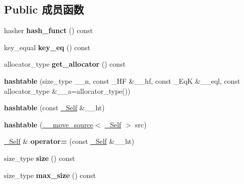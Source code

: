 \subsection*{Public 成员函数}
\begin{DoxyCompactItemize}
\item 
\mbox{\label{classhashtable_ae08e112dcb9455d40455eb795e37feb9}} 
hasher {\bfseries hash\+\_\+funct} () const
\item 
\mbox{\label{classhashtable_a52477a0bb42d4170b09d90291d10ec36}} 
key\+\_\+equal {\bfseries key\+\_\+eq} () const
\item 
\mbox{\label{classhashtable_a45f92c1514cbf95304ddb11228004045}} 
allocator\+\_\+type {\bfseries get\+\_\+allocator} () const
\item 
\mbox{\label{classhashtable_a23fd20375cbba8e496ee88789f89c654}} 
{\bfseries hashtable} (size\+\_\+type \+\_\+\+\_\+n, const \+\_\+\+HF \&\+\_\+\+\_\+hf, const \+\_\+\+EqK \&\+\_\+\+\_\+eql, const allocator\+\_\+type \&\+\_\+\+\_\+a=allocator\+\_\+type())
\item 
\mbox{\label{classhashtable_a68d642038380c9db090140e82daf1fef}} 
{\bfseries hashtable} (const \hyperlink{classhashtable}{\+\_\+\+Self} \&\+\_\+\+\_\+ht)
\item 
\mbox{\label{classhashtable_a1e0899e2bf53826f2531295283fdeb9d}} 
{\bfseries hashtable} (\hyperlink{class____move__source}{\+\_\+\+\_\+move\+\_\+source}$<$ \hyperlink{classhashtable}{\+\_\+\+Self} $>$ src)
\item 
\mbox{\label{classhashtable_a5bc53028dd2381c784e4bb92a318f35e}} 
\hyperlink{classhashtable}{\+\_\+\+Self} \& {\bfseries operator=} (const \hyperlink{classhashtable}{\+\_\+\+Self} \&\+\_\+\+\_\+ht)
\item 
\mbox{\label{classhashtable_ac2327a675ed3949ff1f36495c5211977}} 
size\+\_\+type {\bfseries size} () const
\item 
\mbox{\label{classhashtable_ab345b909b769ec74109810bc36281559}} 
size\+\_\+type {\bfseries max\+\_\+size} () const

\end{DoxyCompactItemize}
